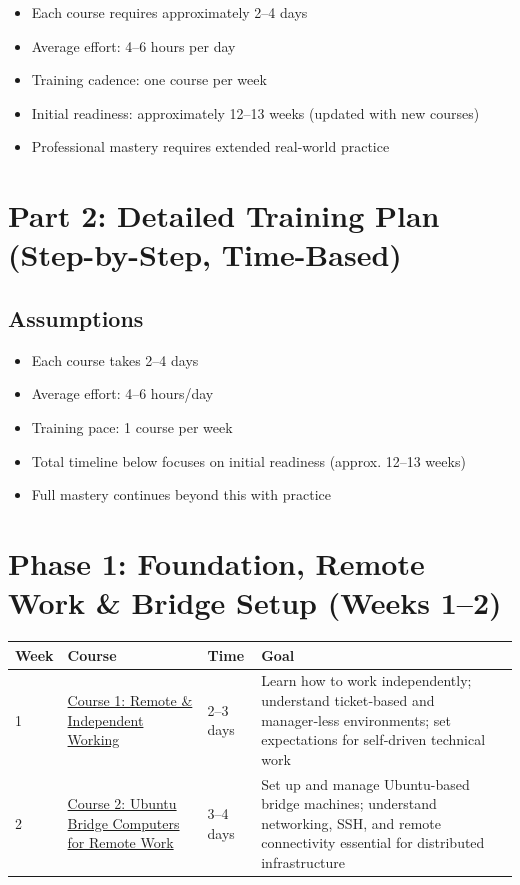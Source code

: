 \documentclass[12pt]{article}
\begin{document}
	\begin{itemize}
		\item Each course requires approximately 2–4 days
		\item Average effort: 4–6 hours per day
		\item Training cadence: one course per week
		\item Initial readiness: approximately 12–13 weeks (updated with new courses)
		\item Professional mastery requires extended real-world practice
	\end{itemize}
	
	\newpage
	
	\section*{Part 2: Detailed Training Plan (Step-by-Step, Time-Based)}
	
	\subsection*{Assumptions}
	\begin{itemize}
		\item Each course takes 2–4 days
		\item Average effort: 4–6 hours/day
		\item Training pace: 1 course per week
		\item Total timeline below focuses on initial readiness (approx. 12–13 weeks)
		\item Full mastery continues beyond this with practice
	\end{itemize}
	
	\vspace{0.5cm}
	
	\section*{Phase 1: Foundation, Remote Work \& Bridge Setup (Weeks 1–2)}
	
	\begin{tabularx}{\textwidth}{|X|p{3cm}|p{3cm}|X|}
		\hline
		\textbf{Week} & \textbf{Course} & \textbf{Time} & \textbf{Goal} \\
		\hline
		1 & \href{https://www.udemy.com/course/remote-independent-working-in-a-managerless-environment-101/}{Course 1: Remote \& Independent Working} & 2–3 days & Learn how to work independently; understand ticket‑based and manager‑less environments; set expectations for self‑driven technical work \\
		\hline
		2 & \href{https://www.udemy.com/course/connecting-managing-ubuntu-bridge-computers-for-remote-work/}{Course 2: Ubuntu Bridge Computers for Remote Work} & 3–4 days & Set up and manage Ubuntu-based bridge machines; understand networking, SSH, and remote connectivity essential for distributed infrastructure \\
		\hline
	\end{tabularx}
	
\end{document}
